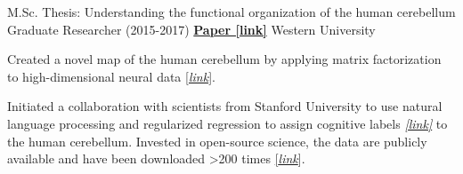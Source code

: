 \begin{cventries}
  \cventry
    {M.Sc. Thesis: Understanding the functional organization of the human cerebellum}
    {Graduate Researcher (2015-2017)} %
    {\href{http://ivrylab.berkeley.edu/uploads/4/1/1/5/41152143/functional_boundaries_in_the_human_cerebellum.pdf}{\textbf{Paper [link]}}}
    {Western University} %
    {
      \begin{cvitems} %
      	\item {Created a novel map of the human cerebellum by applying matrix factorization to high-dimensional neural data {\href{http://www.diedrichsenlab.org/imaging/mdtb.htm}{[\textit{link}}]}.}
      	\item {Initiated a collaboration with scientists from Stanford University to use natural language processing and regularized regression to assign cognitive labels {\href{https://cognitiveatlas.org/}{\textit{[link]}}} to the human cerebellum. Invested in open-source science, the data are publicly available and have been downloaded >200 times {\href{https://openneuro.org/datasets/ds002105/versions/1.1.0}{[\textit{link}}]}.}
      \end{cvitems}
    }
\end{cventries}
